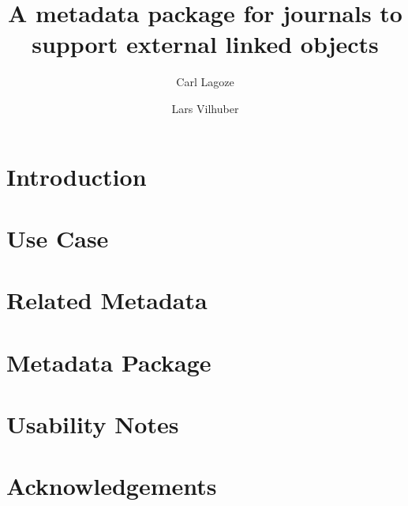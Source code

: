 \documentclass[research,19]{idcc}
\author{Carl Lagoze}
\affil{University of Michigan}
\author{Lars Vilhuber}
\affil{Cornell University}
\title{A metadata package for journals to support external linked objects}
\begin{document}
\maketitle

\begin{abstract}
	
\end{abstract}

\section{Introduction}
\label{sec:intro}


\section{Use Case}
\label{sec:usecase}


\section{Related Metadata}
\label{sec:related-metadata}


\section{Metadata Package}
\label{sec:metadata-package}


\section{Usability Notes}
\label{sec:usability}


\section{Acknowledgements}
\label{sec:ack}



%
%
\printbibliography
\end{document}
